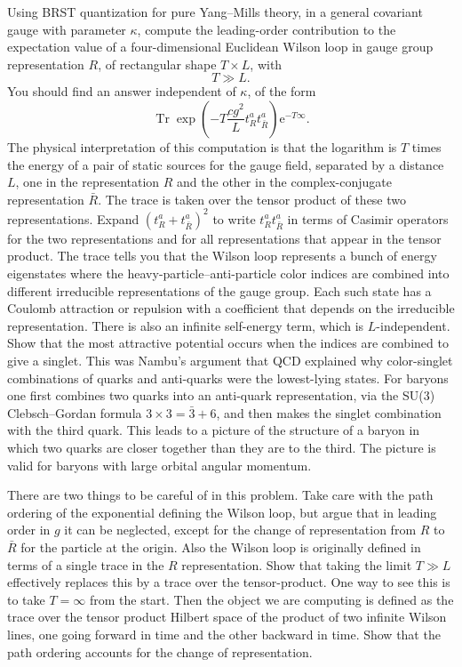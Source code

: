 \begin{banksproblems}
Using BRST quantization for pure Yang--Mills theory, in a general covariant
gauge with parameter $\kappa$, compute the leading-order contribution to the
expectation value of a four-dimensional Euclidean Wilson loop in gauge group representation
$R$, of rectangular shape $T\times L$, with
\[
  T\gg L .
\]
You should find an answer independent of $\kappa$, of the form
\[
  \operatorname{Tr}\exp\left(-T\frac{cg^2}{L}t_R^a t_{\bar R}^a\right)
  \mathrm{e}^{-T\infty} .
\]
The physical interpretation of this computation is that the logarithm is $T$
times the energy of a pair of static sources for the gauge field, separated by
a distance $L$, one in the representation $R$ and the other in the complex-conjugate
representation $\bar R$. The trace is taken over the tensor product
of these two representations. Expand $(t_R^a+t_{\bar R}^a)^2$ to write
$t_R^at_{\bar R}^a$ in terms of Casimir operators for the two representations
and for all representations that appear in the tensor product. The trace tells
you that the Wilson loop represents a bunch of energy eigenstates where the
heavy-particle--anti-particle color indices are combined into different
irreducible representations of the gauge group. Each such state has a Coulomb
attraction or repulsion with a coefficient that depends on the irreducible
representation. There is also an infinite self-energy term, which is
$L$-independent. Show that the most attractive potential occurs when the
indices are combined to give a singlet. This was Nambu's argument that QCD
explained why color-singlet combinations of quarks and anti-quarks were the
lowest-lying states. For baryons one first combines two quarks into an
anti-quark representation, via the SU(3) Clebsch--Gordan formula
$3\times3=\bar3+6$, and then makes the singlet combination with the third
quark. This leads to a picture of the structure of a baryon in which two
quarks are closer together than they are to the third. The picture is valid
for baryons with large orbital angular momentum.

There are two things to be careful of in this problem. Take care with the path
ordering of the exponential defining the Wilson loop, but argue that in
leading order in $g$ it can be neglected, except for the change of
representation from $R$ to $\bar R$ for the particle at the origin. Also the
Wilson loop is originally defined in terms of a single trace in the $R$
representation. Show that taking the limit $T\gg L$ effectively replaces
this by a trace over the tensor-product. One way to see this is to take
$T=\infty$ from the start. Then the object we are computing is defined as the
trace over the tensor product Hilbert space of the product of two infinite
Wilson lines, one going forward in time and the other backward in time. Show
that the path ordering accounts for the change of representation.


\end{banksproblems}
